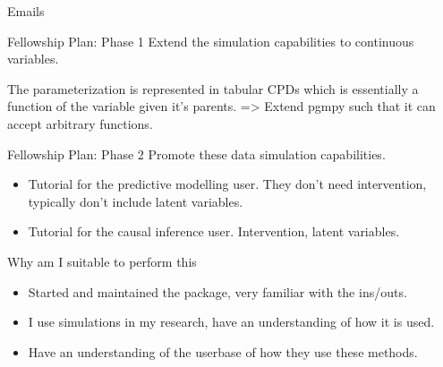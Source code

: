 \documentclass{beamer}
\begin{document}
\begin{frame}{Emails}
\end{frame}

\begin{frame}{Fellowship Plan: Phase 1}
	Extend the simulation capabilities to continuous variables.


	The parameterization is represented in tabular CPDs which is essentially a function of the variable given it's parents. => Extend pgmpy such that it can accept arbitrary functions.
\end{frame}

\begin{frame}{Fellowship Plan: Phase 2}
	Promote these data simulation capabilities.

	\begin{itemize}
		\item Tutorial for the predictive modelling user. They don't need intervention, typically don't include latent variables.
		\item Tutorial for the causal inference user. Intervention, latent variables.
	\end{itemize}
\end{frame}

\begin{frame}{Why am I suitable to perform this}
	\begin{itemize}
		\item Started and maintained the package, very familiar with the ins/outs.
		\item I use simulations in my research, have an understanding of how it is used.
		\item Have an understanding of the userbase of how they use these methods.
	\end{itemize}
\end{frame}
\end{document}

